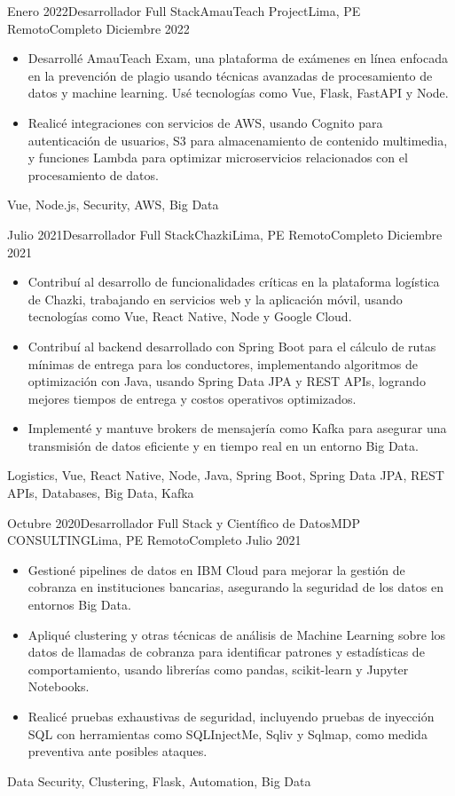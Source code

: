 \begin{experiences}
\emptySeparator
\experience
  {Enero 2022}{Desarrollador Full Stack}{AmauTeach Project}{Lima, PE}
  {Remoto}{Completo}
  {Diciembre 2022} {
    \begin{itemize}
      \item Desarrollé AmauTeach Exam, una plataforma de exámenes en línea enfocada en la prevención de plagio usando técnicas avanzadas de procesamiento de datos y machine learning. Usé tecnologías como Vue, Flask, FastAPI y Node.
      \item Realicé integraciones con servicios de AWS, usando Cognito para autenticación de usuarios, S3 para almacenamiento de contenido multimedia, y funciones Lambda para optimizar microservicios relacionados con el procesamiento de datos.
    \end{itemize}
  }
  {Vue, Node.js, Security, AWS, Big Data}

\emptySeparator
\experience
  {Julio 2021}{Desarrollador Full Stack}{Chazki}{Lima, PE}
  {Remoto}{Completo}
  {Diciembre 2021} {
    \begin{itemize}
      \item Contribuí al desarrollo de funcionalidades críticas en la plataforma logística de Chazki, trabajando en servicios web y la aplicación móvil, usando tecnologías como Vue, React Native, Node y Google Cloud.
      \item Contribuí al backend desarrollado con Spring Boot para el cálculo de rutas mínimas de entrega para los conductores, implementando algoritmos de optimización con Java, usando Spring Data JPA y REST APIs, logrando mejores tiempos de entrega y costos operativos optimizados.
      \item Implementé y mantuve brokers de mensajería como Kafka para asegurar una transmisión de datos eficiente y en tiempo real en un entorno Big Data.
    \end{itemize}
  }
  {Logistics, Vue, React Native, Node, Java, Spring Boot, Spring Data JPA, REST APIs, Databases, Big Data, Kafka}

\emptySeparator
\experience
  {Octubre 2020}{Desarrollador Full Stack y Científico de Datos}{MDP CONSULTING}{Lima, PE}
  {Remoto}{Completo}
  {Julio 2021} {
    \begin{itemize}
      \item Gestioné pipelines de datos en IBM Cloud para mejorar la gestión de cobranza en instituciones bancarias, asegurando la seguridad de los datos en entornos Big Data.
      \item Apliqué clustering y otras técnicas de análisis de Machine Learning sobre los datos de llamadas de cobranza para identificar patrones y estadísticas de comportamiento, usando librerías como pandas, scikit-learn y Jupyter Notebooks.
      \item Realicé pruebas exhaustivas de seguridad, incluyendo pruebas de inyección SQL con herramientas como SQLInjectMe, Sqliv y Sqlmap, como medida preventiva ante posibles ataques.
    \end{itemize}
  }
  {Data Security, Clustering, Flask, Automation, Big Data}


\end{experiences}
